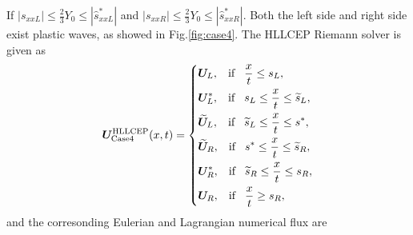 \documentclass{article}
\numberwithin{equation}{section}
\numberwithin{table}{section}
\begin{document}
If $|s_{xxL}| \le \frac{2}{3}Y_0 \le  |\hat{s}_{xxL}^*|$ and  $|s_{xxR}| \le \frac{2}{3}Y_0 \le  |\hat{s}_{xxR}^*|$. Both  the left side  and right side exist plastic waves, as showed in Fig.\ref{fig:case4}. The HLLCEP Riemann solver is given as
 \begin{equation}
   \bm{U}^{\text{HLLCEP}}_{\text{Case4}}(x,t) = \left\{ \begin{aligned}
		& \bm{U}_L, \hspace{0.3cm} \text{if} \hspace{0.3cm} \frac{x}{t}\le s_L, \\
		& \bm{U}_L^*, \hspace{0.3cm} \text{if} \hspace{0.3cm} s_L\le \frac{x}{t} \le \widetilde{s}_L, \\
		& \widetilde{\bm{U}}_L, \hspace{0.3cm} \text{if} \hspace{0.3cm} \widetilde{s}_L\le \frac{x}{t} \le s^*, \\
		& \widetilde{\bm{U}}_R, \hspace{0.3cm} \text{if} \hspace{0.3cm} s^*\le \frac{x}{t} \le \widetilde{s}_R, \\
		& \bm{U}_R^*, \hspace{0.3cm} \text{if} \hspace{0.3cm} \widetilde{s}_R\le \frac{x}{t} \le s_R,\\
		& \bm{U}_R, \hspace{0.3cm} \text{if} \hspace{0.3cm} \frac{x}{t}\ge s_R, \\
	  \end{aligned}
	\right.
  \end{equation}
  and the corresonding Eulerian and Lagrangian numerical flux are
\end{document}
